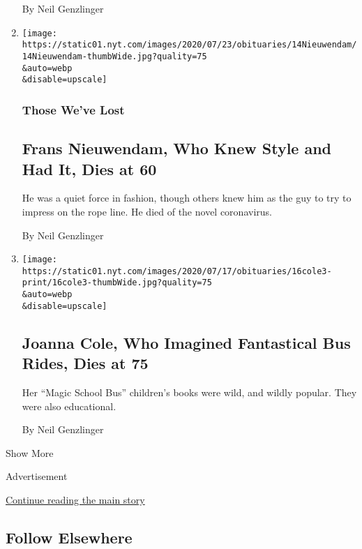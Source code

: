\begin{enumerate}
  By Neil Genzlinger
\item
  \href{/2020/07/18/obituaries/frans-nieuwendam-dead-coronavirus.html}{}

  \texttt{[image: https://static01.nyt.com/images/2020/07/23/obituaries/14Nieuwendam/14Nieuwendam-thumbWide.jpg?quality=75\\\&auto=webp\\\&disable=upscale]}

  \hypertarget{those-weve-lost-1}{%
  \subsubsection{Those We've Lost}\label{those-weve-lost-1}}

  \hypertarget{frans-nieuwendam-who-knew-style-and-had-it-dies-at-60}{%
  \subsection{Frans Nieuwendam, Who Knew Style and Had It, Dies at
  60}\label{frans-nieuwendam-who-knew-style-and-had-it-dies-at-60}}

  He was a quiet force in fashion, though others knew him as the guy to
  try to impress on the rope line. He died of the novel coronavirus.

  By Neil Genzlinger
\item
  \href{/2020/07/16/books/joanna-cole-dead.html}{}

  \texttt{[image: https://static01.nyt.com/images/2020/07/17/obituaries/16cole3-print/16cole3-thumbWide.jpg?quality=75\\\&auto=webp\\\&disable=upscale]}

  \hypertarget{joanna-cole-who-imagined-fantastical-bus-rides-dies-at-75}{%
  \subsection{Joanna Cole, Who Imagined Fantastical Bus Rides, Dies at
  75}\label{joanna-cole-who-imagined-fantastical-bus-rides-dies-at-75}}

  Her ``Magic School Bus'' children's books were wild, and wildly
  popular. They were also educational.

  By Neil Genzlinger
\end{enumerate}

Show More

Advertisement

\protect\hyperlink{after-mid2}{Continue reading the main story}

\hypertarget{follow-elsewhere}{%
\subsection{Follow Elsewhere}\label{follow-elsewhere}}

